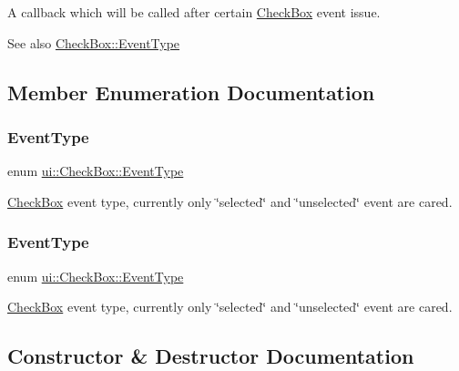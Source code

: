 A callback which will be called after certain \hyperlink{classui_1_1CheckBox}{Check\+Box} event issue. \begin{DoxySeeAlso}{See also}
{\ttfamily \hyperlink{classui_1_1CheckBox_a72686e7bedf29fe84c5bc952be237b50}{Check\+Box\+::\+Event\+Type}} 
\end{DoxySeeAlso}


\subsection{Member Enumeration Documentation}
\mbox{\label{classui_1_1CheckBox_a72686e7bedf29fe84c5bc952be237b50}} 
\subsubsection{\texorpdfstring{Event\+Type}{EventType}\hspace{0.1cm}{\footnotesize\ttfamily [1/2]}}
{\footnotesize\ttfamily enum \hyperlink{classui_1_1CheckBox_a72686e7bedf29fe84c5bc952be237b50}{ui\+::\+Check\+Box\+::\+Event\+Type}\hspace{0.3cm}{\ttfamily [strong]}}

\hyperlink{classui_1_1CheckBox}{Check\+Box} event type, currently only \char`\"{}selected\char`\"{} and \char`\"{}unselected\char`\"{} event are cared. \mbox{\label{classui_1_1CheckBox_a72686e7bedf29fe84c5bc952be237b50}} 
\subsubsection{\texorpdfstring{Event\+Type}{EventType}\hspace{0.1cm}{\footnotesize\ttfamily [2/2]}}
{\footnotesize\ttfamily enum \hyperlink{classui_1_1CheckBox_a72686e7bedf29fe84c5bc952be237b50}{ui\+::\+Check\+Box\+::\+Event\+Type}\hspace{0.3cm}{\ttfamily [strong]}}

\hyperlink{classui_1_1CheckBox}{Check\+Box} event type, currently only \char`\"{}selected\char`\"{} and \char`\"{}unselected\char`\"{} event are cared. 

\subsection{Constructor \& Destructor Documentation}
\mbox{\label{classui_1_1CheckBox_ac425e54f8b23e74fe64c904f700c707b}} 
